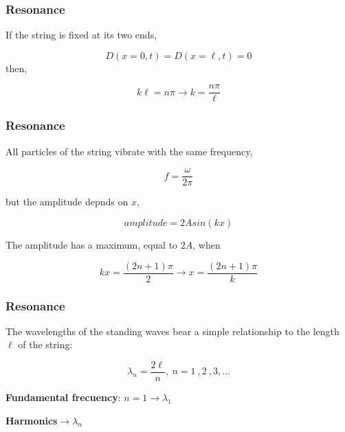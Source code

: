 \documentclass[]{beamer}
\begin{document}
\begin{frame}
\frametitle{Resonance}

If the string is fixed at its two ends,

\begin{equation*}
D(x=0,t)=D(x=\ell,t)=0
\end{equation*}
then,

\begin{equation}
 k\ell=n\pi \rightarrow k=\frac{ n\pi}{\ell}
\end{equation}

  \end{frame}








\begin{frame}
\frametitle{Resonance}


All particles of the string vibrate with
the same frequency,


\begin{equation*}
f=\frac{\omega}{2\pi}
\end{equation*}

but the amplitude depnds on $x$,


\begin{equation*}
amplitude=2Asin(kx)
\end{equation*}

The amplitude has a maximum, equal to $2A$, when

\begin{equation}
 kx=\frac{(2n+1)\pi}{2} \rightarrow x=\frac{(2 n+1)\pi}{k}
\end{equation}


  \end{frame}



\begin{frame}
\frametitle{Resonance}

The wavelengths of the
standing waves bear a simple relationship to the length $\ell$ of the string:

\begin{equation}
\lambda_n=\frac{2\ell}{n},~n=1~,2~,3,...
\end{equation}

\textbf{Fundamental frecuency}: $n=1\rightarrow \lambda_1$

\vspace{3mm}

\textbf{Harmonics}$\rightarrow  \lambda_n$

  \end{frame}
\end{document}
